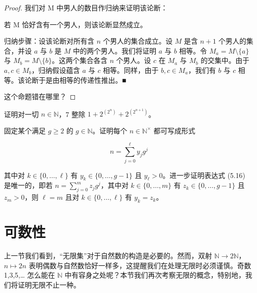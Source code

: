 
\begin{proof}

我们对 M 中男人的数目作归纳来证明该论断：

\begin{items}
\item

若 M 恰好含有一个男人，则该论断显然成立。

\item

归纳步骤：设该论断对所有含 $n$ 个男人的集合成立。设 $M$ 是含 $n+1$ 个男人的集合，并设 $a$ 与 $b$ 是 $M$ 中的两个男人。我们将证明 $a$ 与 $b$ 相等。令 $M_a = M \setminus \{a\}$ 与 $M_b = M \setminus \{b\}$。这两个集合各含 $n$ 个男人。设 $c$ 在 $M_a$ 与 $M_b$ 的交集中。由于 $a, c \in M_b$，归纳假设蕴含 $a$ 与 $c$ 相等。同样，由于 $b, c \in M_a$，我们有 $b$ 与 $c$ 相等。该论断于是由相等的传递性推出。■

\end{items}

这个命题错在哪里？

\end{proof}

\begin{exercises}
\item[10.]

证明对一切 $ n \in \mathbb{N} $，7 整除 $ 1 + 2^{(2^n)} + 2^{(2^{n+1})} $。

\item[11.]

固定某个满足 $ g \geq 2 $ 的 $ g \in \mathbb{N} $。证明每个 $ n \in \mathbb{N}^\times $ 都可写成形式

\[
n=\sum_{j=0}^{\ell}y_{j} g^{j}
\]

其中对 $ k \in \{0, \ldots, \ell\} $ 有 $ y_k \in \{0, \ldots, g-1\} $ 且 $ y_\ell > 0 $。进一步证明表达式 (5.16) 是唯一的，即若 $ n = \sum_{j=0}^{m} z_j g^j $，其中对 $ k \in \{0, \ldots, m\} $ 有 $ z_k \in \{0, \ldots, g-1\} $ 且 $ z_m > 0 $，则 $ \ell = m $ 且对 $ k \in \{0, \ldots, \ell\} $ 有 $ y_k = z_k $。

\end{exercises}

\section{可数性}

上一节我们看到，“无限集”对于自然数的构造是必要的。然而，双射 $ \mathbb{N} \to 2\mathbb{N} $，$ n \mapsto 2n $ 表明偶数与自然数恰好一样多，这提醒我们在处理无限时必须谨慎。奇数 1,3,5,… 怎么能在 $ \mathbb{N} $ 中有容身之处呢？本节我们再次考察无限的概念，特别地，我们将证明无限不止一种。

